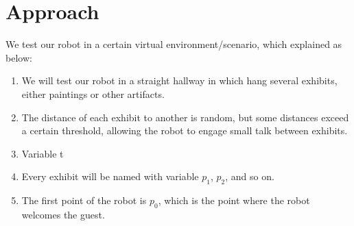 \section{Approach}

We test our robot in a certain virtual environment/scenario, which explained as below:

\begin{enumerate}
    \item We will test our robot in a straight hallway in which hang several exhibits, either paintings or other artifacts.
    \item The distance of each exhibit to another is random, but some distances exceed a certain threshold, allowing the robot to engage small talk between exhibits. 
    \item Variable t 
    \item Every exhibit will be named with variable $p_1$, $p_2$, and so on.
    \item The first point of the robot is $p_0$, which is the point where the robot welcomes the guest. 
\end{enumerate}
